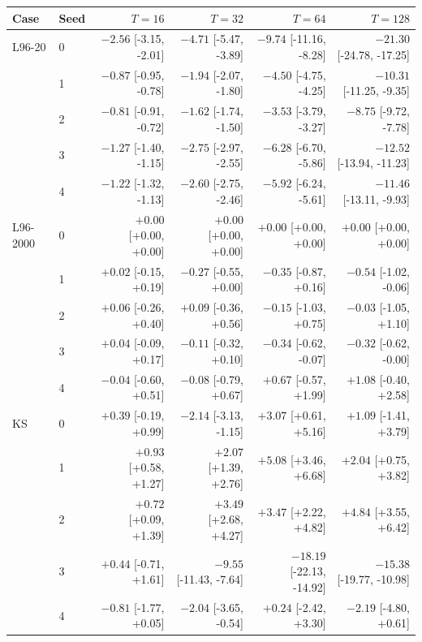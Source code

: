\begin{tabular}{llrrrr}
\toprule
Case & Seed & $T=16$ & $T=32$ & $T=64$ & $T=128$\\
\midrule
L96-20 & 0 & $-2.56$ [-3.15, -2.01] & $-4.71$ [-5.47, -3.89] & $-9.74$ [-11.16, -8.28] & $-21.30$ [-24.78, -17.25]\\
 & 1 & $-0.87$ [-0.95, -0.78] & $-1.94$ [-2.07, -1.80] & $-4.50$ [-4.75, -4.25] & $-10.31$ [-11.25, -9.35]\\
 & 2 & $-0.81$ [-0.91, -0.72] & $-1.62$ [-1.74, -1.50] & $-3.53$ [-3.79, -3.27] & $-8.75$ [-9.72, -7.78]\\
 & 3 & $-1.27$ [-1.40, -1.15] & $-2.75$ [-2.97, -2.55] & $-6.28$ [-6.70, -5.86] & $-12.52$ [-13.94, -11.23]\\
 & 4 & $-1.22$ [-1.32, -1.13] & $-2.60$ [-2.75, -2.46] & $-5.92$ [-6.24, -5.61] & $-11.46$ [-13.11, -9.93]\\
\midrule
L96-2000 & 0 & $+0.00$ [+0.00, +0.00] & $+0.00$ [+0.00, +0.00] & $+0.00$ [+0.00, +0.00] & $+0.00$ [+0.00, +0.00]\\
 & 1 & $+0.02$ [-0.15, +0.19] & $-0.27$ [-0.55, +0.00] & $-0.35$ [-0.87, +0.16] & $-0.54$ [-1.02, -0.06]\\
 & 2 & $+0.06$ [-0.26, +0.40] & $+0.09$ [-0.36, +0.56] & $-0.15$ [-1.03, +0.75] & $-0.03$ [-1.05, +1.10]\\
 & 3 & $+0.04$ [-0.09, +0.17] & $-0.11$ [-0.32, +0.10] & $-0.34$ [-0.62, -0.07] & $-0.32$ [-0.62, -0.00]\\
 & 4 & $-0.04$ [-0.60, +0.51] & $-0.08$ [-0.79, +0.67] & $+0.67$ [-0.57, +1.99] & $+1.08$ [-0.40, +2.58]\\
\midrule
KS & 0 & $+0.39$ [-0.19, +0.99] & $-2.14$ [-3.13, -1.15] & $+3.07$ [+0.61, +5.16] & $+1.09$ [-1.41, +3.79]\\
 & 1 & $+0.93$ [+0.58, +1.27] & $+2.07$ [+1.39, +2.76] & $+5.08$ [+3.46, +6.68] & $+2.04$ [+0.75, +3.82]\\
 & 2 & $+0.72$ [+0.09, +1.39] & $+3.49$ [+2.68, +4.27] & $+3.47$ [+2.22, +4.82] & $+4.84$ [+3.55, +6.42]\\
 & 3 & $+0.44$ [-0.71, +1.61] & $-9.55$ [-11.43, -7.64] & $-18.19$ [-22.13, -14.92] & $-15.38$ [-19.77, -10.98]\\
 & 4 & $-0.81$ [-1.77, +0.05] & $-2.04$ [-3.65, -0.54] & $+0.24$ [-2.42, +3.30] & $-2.19$ [-4.80, +0.61]\\
\bottomrule
\end{tabular}
